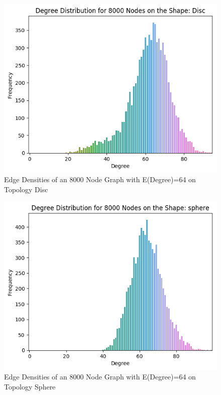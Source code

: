 \documentclass{article}
\begin{document}
  \begin{figure}[H]

    \includegraphics[width=1 \textwidth]{disc/edge_density/8000_64.png}
    \caption{Edge Densities of an 8000 Node Graph with E(Degree)=64 on Topology Disc}
  \end{figure}

  \begin{figure}[H]

    \includegraphics[width=1 \textwidth]{sphere/edge_density/8000_64.png}
    \caption{Edge Densities of an 8000 Node Graph with E(Degree)=64 on Topology Sphere}
  \end{figure}
\end{document}
